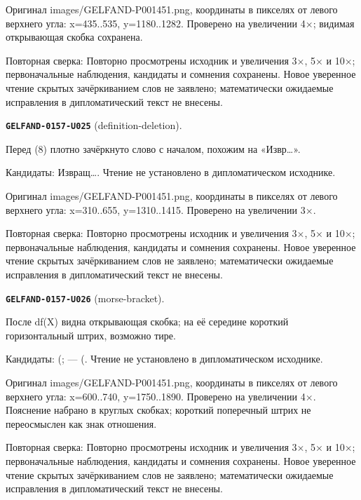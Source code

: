 Оригинал images/GELFAND-P001451.png, координаты в пикселях от левого верхнего угла: x=435..535, y=1180..1282. Проверено на увеличении 4×; видимая открывающая скобка сохранена.\par
Повторная сверка: Повторно просмотрены исходник и увеличения 3×, 5× и 10×; первоначальные наблюдения, кандидаты и сомнения сохранены. Новое уверенное чтение скрытых зачёркиванием слов не заявлено; математически ожидаемые исправления в дипломатический текст не внесены.\par\medskip
\par\noindent\leavevmode{}\label{GELFAND-0157-U025}\label{GELFAND-P001451:definition-deletion}\textbf{\texttt{GELFAND-0157-U025}} (definition-deletion).\nopagebreak[4]\par
Перед (8) плотно зачёркнуто слово с началом, похожим на «Извр…».\par
Кандидаты: Извращ…. Чтение не установлено в дипломатическом исходнике.\par
Оригинал images/GELFAND-P001451.png, координаты в пикселях от левого верхнего угла: x=310..655, y=1310..1415. Проверено на увеличении 3×.\par
Повторная сверка: Повторно просмотрены исходник и увеличения 3×, 5× и 10×; первоначальные наблюдения, кандидаты и сомнения сохранены. Новое уверенное чтение скрытых зачёркиванием слов не заявлено; математически ожидаемые исправления в дипломатический текст не внесены.\par\medskip
\par\noindent\leavevmode{}\label{GELFAND-0157-U026}\label{GELFAND-P001451:morse-bracket}\textbf{\texttt{GELFAND-0157-U026}} (morse-bracket).\nopagebreak[4]\par
После df(X) видна открывающая скобка; на её середине короткий горизонтальный штрих, возможно тире.\par
Кандидаты: (; — (. Чтение не установлено в дипломатическом исходнике.\par
Оригинал images/GELFAND-P001451.png, координаты в пикселях от левого верхнего угла: x=600..740, y=1750..1890. Проверено на увеличении 4×. Пояснение набрано в круглых скобках; короткий поперечный штрих не переосмыслен как знак отношения.\par
Повторная сверка: Повторно просмотрены исходник и увеличения 3×, 5× и 10×; первоначальные наблюдения, кандидаты и сомнения сохранены. Новое уверенное чтение скрытых зачёркиванием слов не заявлено; математически ожидаемые исправления в дипломатический текст не внесены.\par\medskip
